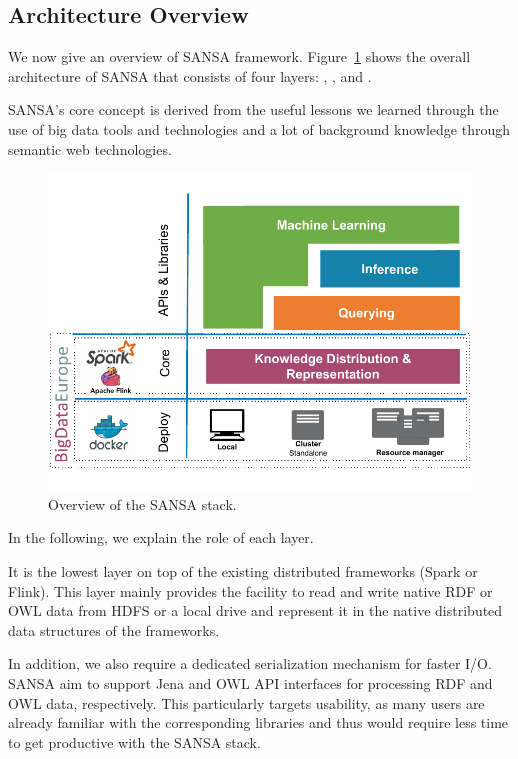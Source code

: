 \subsection{Architecture Overview}
\label{sec:sansa-architecture}

We now give an overview of SANSA framework.
Figure~\ref{fig:imp-use-cases-sansa-architecture} shows the overall architecture of SANSA that consists of four layers: , ,  and .

SANSA's core concept is derived from the useful lessons we learned through the use of big data tools and technologies and a lot of background knowledge through semantic web technologies.

\begin{figure}
\centering 
	\includegraphics[width=0.95\columnwidth]{images/7_implemenation_and_usecases/sansa-architecture.pdf}
	\caption{Overview of the SANSA stack.}
	\label{fig:imp-use-cases-sansa-architecture}
\end{figure}

In the following, we explain the role of each layer.

It is the lowest layer on top of the existing distributed frameworks (Spark or Flink).
This layer mainly provides the facility to read and write native RDF or OWL data from HDFS or a local drive and represent it in the native distributed data structures of the frameworks.

In addition, we also require a dedicated serialization mechanism for faster I/O. 
SANSA aim to support Jena and OWL API interfaces for processing RDF and OWL data, respectively.
This particularly targets usability, as many users are already familiar with the corresponding libraries and thus would require less time to get productive with the SANSA stack.

